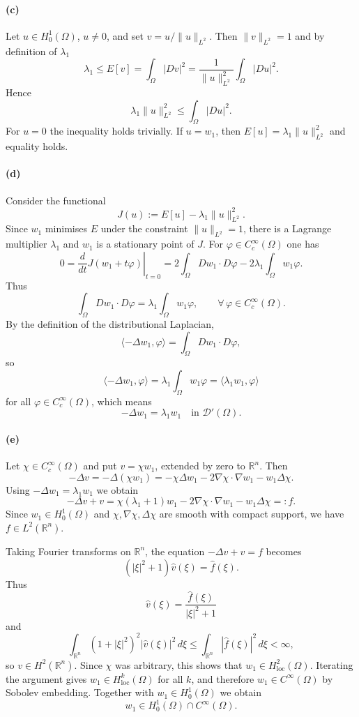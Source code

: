 \documentclass[12pt,a4paper]{article}
\theoremstyle{plain}
\theoremstyle{definition}
\theoremstyle{remark}
\theoremstyle{remark}
\begin{document}
\paragraph{(c)} Let $u\in H_0^1(\Omega)$, $u\neq 0$, and set
$v=u/\|u\|_{L^2}$. Then $\|v\|_{L^2}=1$ and by definition of $\lambda_1$
\[
\lambda_1\le E[v]
=\int_\Omega|Dv|^2
=\frac{1}{\|u\|_{L^2}^2}\int_\Omega |Du|^2.
\]
Hence
\[
\lambda_1\|u\|_{L^2}^2\le\int_\Omega |Du|^2.
\]
For $u=0$ the inequality holds trivially. If $u=w_1$, then
$E[u]=\lambda_1\|u\|_{L^2}^2$ and equality holds.

\paragraph{(d)} Consider the functional
\[
J(u):=E[u]-\lambda_1\|u\|_{L^2}^2.
\]
Since $w_1$ minimises $E$ under the constraint $\|u\|_{L^2}=1$, there is a
Lagrange multiplier $\lambda_1$ and $w_1$ is a stationary point of $J$.
For $\varphi\in C_c^\infty(\Omega)$ one has
\[
0 = \left.\frac{d}{dt}J(w_1+t\varphi)\right|_{t=0}
=2\int_\Omega Dw_1\cdot D\varphi
-2\lambda_1\int_\Omega w_1\varphi.
\]
Thus
\[
\int_\Omega Dw_1\cdot D\varphi
=\lambda_1\int_\Omega w_1\varphi,
\qquad\forall\,\varphi\in C_c^\infty(\Omega).
\]
By the definition of the distributional Laplacian,
\[
\langle -\Delta w_1,\varphi\rangle
=\int_\Omega Dw_1\cdot D\varphi,
\]
so
\[
\langle -\Delta w_1,\varphi\rangle
=\lambda_1\int_\Omega w_1\varphi
=\langle \lambda_1 w_1,\varphi\rangle
\]
for all $\varphi\in C_c^\infty(\Omega)$, which means
\[
-\Delta w_1=\lambda_1 w_1 \quad\text{in }\mathcal{D}'(\Omega).
\]

\paragraph{(e)} Let $\chi\in C_c^\infty(\Omega)$ and put $v=\chi w_1$,
extended by zero to $\mathbb{R}^n$. Then
\[
-\Delta v = -\Delta(\chi w_1)
= -\chi\Delta w_1 - 2\nabla\chi\cdot\nabla w_1 - w_1\Delta\chi.
\]
Using $-\Delta w_1=\lambda_1 w_1$ we obtain
\[
-\Delta v + v
= \chi(\lambda_1+1)w_1 - 2\nabla\chi\cdot\nabla w_1 - w_1\Delta\chi
=:f.
\]
Since $w_1\in H_0^1(\Omega)$ and $\chi,\nabla\chi,\Delta\chi$ are smooth with
compact support, we have $f\in L^2(\mathbb{R}^n)$.

Taking Fourier transforms on $\mathbb{R}^n$, the equation
$-\Delta v + v = f$ becomes
\[
(|\xi|^2+1)\widehat{v}(\xi)=\widehat{f}(\xi).
\]
Thus
\[
\widehat{v}(\xi)=\frac{\widehat{f}(\xi)}{|\xi|^2+1}
\]
and
\[
\int_{\mathbb{R}^n}(1+|\xi|^2)^2|\widehat{v}(\xi)|^2\,d\xi
\le\int_{\mathbb{R}^n}|\widehat{f}(\xi)|^2\,d\xi<\infty,
\]
so $v\in H^2(\mathbb{R}^n)$. Since $\chi$ was arbitrary, this shows that
$w_1\in H^2_{\mathrm{loc}}(\Omega)$. Iterating the argument gives
$w_1\in H^k_{\mathrm{loc}}(\Omega)$ for all $k$, and therefore
$w_1\in C^\infty(\Omega)$ by Sobolev embedding. Together with
$w_1\in H_0^1(\Omega)$ we obtain
\[
w_1\in H_0^1(\Omega)\cap C^\infty(\Omega).
\]
\end{document}
